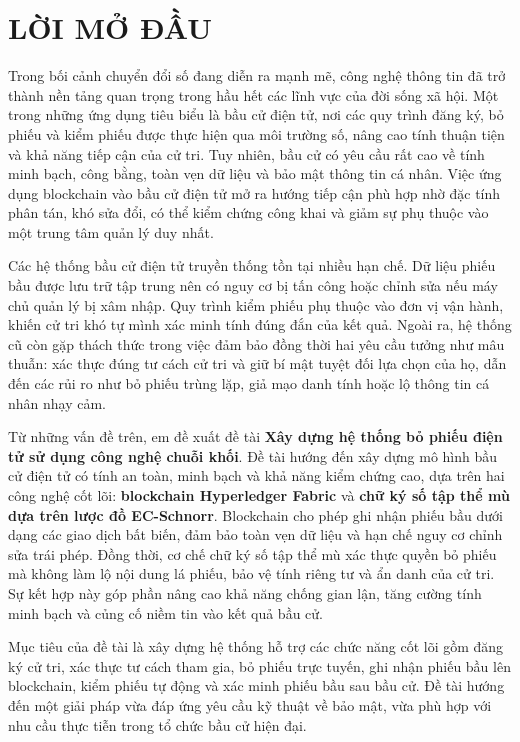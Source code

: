 \section*{LỜI MỞ ĐẦU}
Trong bối cảnh chuyển đổi số đang diễn ra mạnh mẽ, công nghệ thông tin đã trở thành nền tảng quan trọng trong hầu hết các lĩnh vực của đời sống xã hội. Một trong những ứng dụng tiêu biểu là bầu cử điện tử, nơi các quy trình đăng ký, bỏ phiếu và kiểm phiếu được thực hiện qua môi trường số, nâng cao tính thuận tiện và khả năng tiếp cận của cử tri. Tuy nhiên, bầu cử có yêu cầu rất cao về tính minh bạch, công bằng, toàn vẹn dữ liệu và bảo mật thông tin cá nhân. Việc ứng dụng blockchain vào bầu cử điện tử mở ra hướng tiếp cận phù hợp nhờ đặc tính phân tán, khó sửa đổi, có thể kiểm chứng công khai và giảm sự phụ thuộc vào một trung tâm quản lý duy nhất.

Các hệ thống bầu cử điện tử truyền thống tồn tại nhiều hạn chế. Dữ liệu phiếu bầu được lưu trữ tập trung nên có nguy cơ bị tấn công hoặc chỉnh sửa nếu máy chủ quản lý bị xâm nhập. Quy trình kiểm phiếu phụ thuộc vào đơn vị vận hành, khiến cử tri khó tự mình xác minh tính đúng đắn của kết quả. Ngoài ra, hệ thống cũ còn gặp thách thức trong việc đảm bảo đồng thời hai yêu cầu tưởng như mâu thuẫn: xác thực đúng tư cách cử tri và giữ bí mật tuyệt đối lựa chọn của họ, dẫn đến các rủi ro như bỏ phiếu trùng lặp, giả mạo danh tính hoặc lộ thông tin cá nhân nhạy cảm.

Từ những vấn đề trên, em đề xuất đề tài \textbf{Xây dựng hệ thống bỏ phiếu điện tử sử dụng công nghệ chuỗi khối}. Đề tài hướng đến xây dựng mô hình bầu cử điện tử có tính an toàn, minh bạch và khả năng kiểm chứng cao, dựa trên hai công nghệ cốt lõi: \textbf{blockchain Hyperledger Fabric} và \textbf{chữ ký số tập thể mù dựa trên lược đồ EC-Schnorr}. Blockchain cho phép ghi nhận phiếu bầu dưới dạng các giao dịch bất biến, đảm bảo toàn vẹn dữ liệu và hạn chế nguy cơ chỉnh sửa trái phép. Đồng thời, cơ chế chữ ký số tập thể mù xác thực quyền bỏ phiếu mà không làm lộ nội dung lá phiếu, bảo vệ tính riêng tư và ẩn danh của cử tri. Sự kết hợp này góp phần nâng cao khả năng chống gian lận, tăng cường tính minh bạch và củng cố niềm tin vào kết quả bầu cử.

Mục tiêu của đề tài là xây dựng hệ thống hỗ trợ các chức năng cốt lõi gồm đăng ký cử tri, xác thực tư cách tham gia, bỏ phiếu trực tuyến, ghi nhận phiếu bầu lên blockchain, kiểm phiếu tự động và xác minh phiếu bầu sau bầu cử. Đề tài hướng đến một giải pháp vừa đáp ứng yêu cầu kỹ thuật về bảo mật, vừa phù hợp với nhu cầu thực tiễn trong tổ chức bầu cử hiện đại.
\newpage
\clearpage
